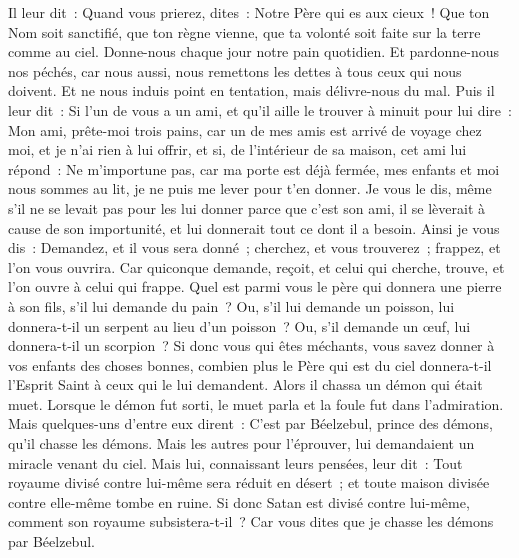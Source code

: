 \begin{multicols}{2}
Il leur dit~: Quand vous prierez, dites~: Notre Père qui es aux cieux~! Que ton Nom soit sanctifié, que ton règne vienne, que ta volonté soit faite sur la terre comme au ciel.
Donne-nous chaque jour notre pain quotidien.
Et pardonne-nous nos péchés, car nous aussi, nous remettons les dettes à tous ceux qui nous doivent. Et ne nous induis point en tentation, mais délivre-nous du mal.
Puis il leur dit~: Si l'un de vous a un ami, et qu'il aille le trouver à minuit pour lui dire~: Mon ami, prête-moi trois pains,
car un de mes amis est arrivé de voyage chez moi, et je n'ai rien à lui offrir,
et si, de l'intérieur de sa maison, cet ami lui répond~: Ne m'importune pas, car ma porte est déjà fermée, mes enfants et moi nous sommes au lit, je ne puis me lever pour t'en donner.
Je vous le dis, même s'il ne se levait pas pour les lui donner parce que c'est son ami, il se lèverait à cause de son importunité, et lui donnerait tout ce dont il a besoin.
Ainsi je vous dis~: Demandez, et il vous sera donné~; cherchez, et vous trouverez~; frappez, et l'on vous ouvrira.
Car quiconque demande, reçoit, et celui qui cherche, trouve, et l'on ouvre à celui qui frappe.
Quel est parmi vous le père qui donnera une pierre à son fils, s'il lui demande du pain~? Ou, s'il lui demande un poisson, lui donnera-t-il un serpent au lieu d'un poisson~?
Ou, s'il demande un œuf, lui donnera-t-il un scorpion~?
Si donc vous qui êtes méchants, vous savez donner à vos enfants des choses bonnes, combien plus le Père qui est du ciel donnera-t-il l'Esprit Saint à ceux qui le lui demandent.
Alors il chassa un démon qui était muet. Lorsque le démon fut sorti, le muet parla et la foule fut dans l'admiration.
Mais quelques-uns d'entre eux dirent~: C'est par Béelzebul, prince des démons, qu'il chasse les démons.
Mais les autres pour l'éprouver, lui demandaient un miracle venant du ciel.
Mais lui, connaissant leurs pensées, leur dit~: Tout royaume divisé contre lui-même sera réduit en désert~; et toute maison divisée contre elle-même tombe en ruine.
Si donc Satan est divisé contre lui-même, comment son royaume subsistera-t-il~? Car vous dites que je chasse les démons par Béelzebul.

\end{multicols}
